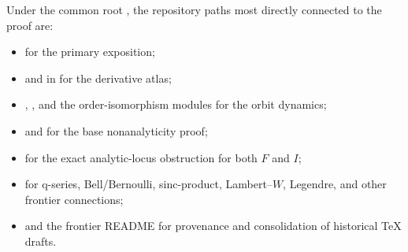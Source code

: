 \documentclass[11pt,oneside]{article}
\theoremstyle{definition}
\theoremstyle{remark}
\begin{document}
Under the common root , the repository paths most
directly connected to the proof are:
\begin{itemize}[leftmargin=2em]
 \item {}
 for the primary exposition;
 \item {}
 and  in  for the derivative atlas;
 \item {}, , and the order-isomorphism
 modules for the orbit dynamics;
 \item {} and  for the
 base nonanalyticity proof;
 \item {} for the exact
 analytic-locus obstruction for both $F$ and $I$;
 \item {} for q-series, Bell/Bernoulli,
 sinc-product, Lambert--$W$, Legendre, and other frontier connections;
 \item {} and the frontier README for provenance and consolidation
 of historical TeX drafts.
\end{itemize}
\end{document}
